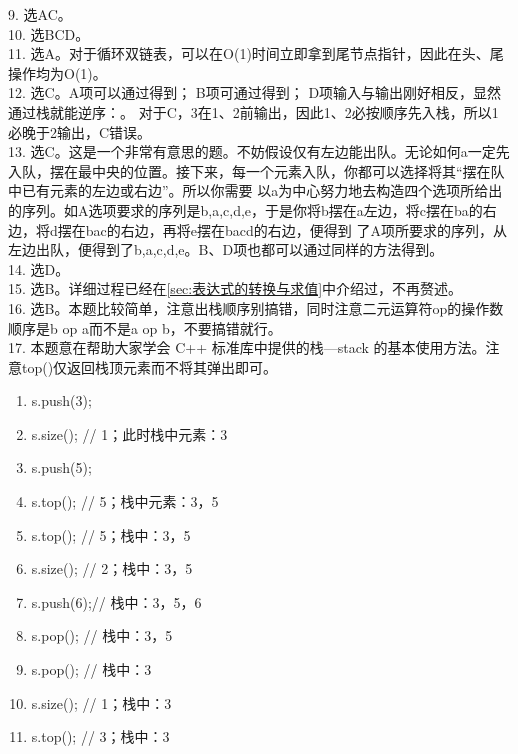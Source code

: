 \begin{exerciseanswer}
    9. 选AC。\\

    10. 选BCD。\\

    11. 选A。对于循环双链表，可以在O(1)时间立即拿到尾节点指针，因此在头、尾操作均为O(1)。\\

    12. 选C。A项可以通过得到；
    B项可通过得到；
    D项输入与输出刚好相反，显然通过栈就能逆序：。
    对于C，3在1、2前输出，因此1、2必按顺序先入栈，所以1必晚于2输出，C错误。\\

    13. 选C。这是一个非常有意思的题。不妨假设仅有左边能出队。无论如何a一定先入队，摆在最中央的位置。接下来，每一个元素入队，你都可以选择将其“摆在队中已有元素的左边或右边”。所以你需要
    以a为中心努力地去构造四个选项所给出的序列。如A选项要求的序列是b,a,c,d,e，于是你将b摆在a左边，将c摆在ba的右边，将d摆在bac的右边，再将e摆在bacd的右边，便得到
    了A项所要求的序列，从左边出队，便得到了b,a,c,d,e。B、D项也都可以通过同样的方法得到。\\

    14. 选D。\\
    
    15. 选B。详细过程已经在\ref{sec:表达式的转换与求值}中介绍过，不再赘述。\\

    16. 选B。本题比较简单，注意出栈顺序别搞错，同时注意二元运算符op的操作数顺序是b op a而不是a op b，不要搞错就行。\\

    17. 本题意在帮助大家学会 C++ 标准库中提供的栈---stack 的基本使用方法。注意top()仅返回栈顶元素而不将其弹出即可。
    \begin{enumerate}[label=\arabic*）]
        \item s.push(3);
        \item s.size(); // 1；此时栈中元素：3
        \item s.push(5);
        \item s.top();  // 5；栈中元素：3，5
        \item s.top();  // 5；栈中：3，5
        \item s.size(); // 2；栈中：3，5
        \item s.push(6);// 栈中：3，5，6
        \item s.pop();  // 栈中：3，5
        \item s.pop();  // 栈中：3
        \item s.size(); // 1；栈中：3
        \item s.top();  // 3；栈中：3
    \end{enumerate}


\end{exerciseanswer}
